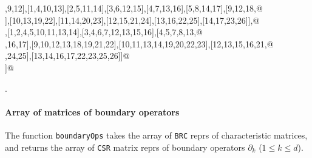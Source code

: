 \documentclass[11pt,oneside]{article}	%
\begin{document}
\begin{flushleft}
\begin{list}{}{}
\mbox{},9,12],[1,4,10,13],[2,5,11,14],[3,6,12,15],[4,7,13,16],[5,8,14,17],[9,12,18,@\\
\mbox{}],[10,13,19,22],[11,14,20,23],[12,15,21,24],[13,16,22,25],[14,17,23,26]],@\\
\mbox{}\verb@[[0,1,3,4,9,10,12,13],[1,2,4,5,10,11,13,14],[3,4,6,7,12,13,15,16],[4,5,7,8,13,@\\
\mbox{},16,17],[9,10,12,13,18,19,21,22],[10,11,13,14,19,20,22,23],[12,13,15,16,21,@\\
\mbox{},24,25],[13,14,16,17,22,23,25,26]]@\\
\mbox{}\verb@]@\\
\mbox{}\verb@@{\NWsep}
\end{list}
\vspace{-1ex}
\footnotesize\addtolength{\baselineskip}{-1ex}
\begin{list}{}{\setlength{\itemsep}{-\parsep}\setlength{\itemindent}{-\leftmargin}}
\item {\NWtxtMacroNoRef}.
\end{list}
\end{flushleft}


\paragraph{Array of matrices of boundary operators}

The function \texttt{boundaryOps} takes the array of \texttt{BRC} reprs of characteristic matrices, and returns the array of \texttt{CSR} matrix reprs of boundary operators $\partial_k$ ($1\leq k\leq d$).
\end{document}
